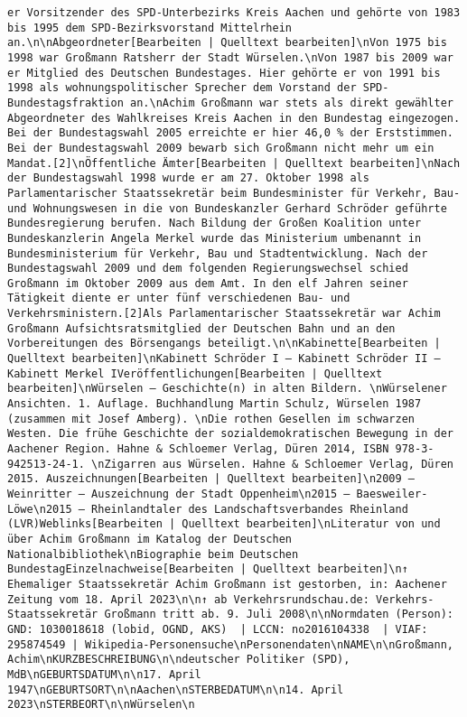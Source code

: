 \documentclass[
]{article}
\begin{document}
\begin{verbatim}
er Vorsitzender des SPD-Unterbezirks Kreis Aachen und gehörte von 1983 bis 1995 dem SPD-Bezirksvorstand Mittelrhein an.\n\nAbgeordneter[Bearbeiten | Quelltext bearbeiten]\nVon 1975 bis 1998 war Großmann Ratsherr der Stadt Würselen.\nVon 1987 bis 2009 war er Mitglied des Deutschen Bundestages. Hier gehörte er von 1991 bis 1998 als wohnungspolitischer Sprecher dem Vorstand der SPD-Bundestagsfraktion an.\nAchim Großmann war stets als direkt gewählter Abgeordneter des Wahlkreises Kreis Aachen in den Bundestag eingezogen. Bei der Bundestagswahl 2005 erreichte er hier 46,0 % der Erststimmen. Bei der Bundestagswahl 2009 bewarb sich Großmann nicht mehr um ein Mandat.[2]\nÖffentliche Ämter[Bearbeiten | Quelltext bearbeiten]\nNach der Bundestagswahl 1998 wurde er am 27. Oktober 1998 als Parlamentarischer Staatssekretär beim Bundesminister für Verkehr, Bau- und Wohnungswesen in die von Bundeskanzler Gerhard Schröder geführte Bundesregierung berufen. Nach Bildung der Großen Koalition unter Bundeskanzlerin Angela Merkel wurde das Ministerium umbenannt in Bundesministerium für Verkehr, Bau und Stadtentwicklung. Nach der Bundestagswahl 2009 und dem folgenden Regierungswechsel schied Großmann im Oktober 2009 aus dem Amt. In den elf Jahren seiner Tätigkeit diente er unter fünf verschiedenen Bau- und Verkehrsministern.[2]Als Parlamentarischer Staatssekretär war Achim Großmann Aufsichtsratsmitglied der Deutschen Bahn und an den Vorbereitungen des Börsengangs beteiligt.\n\nKabinette[Bearbeiten | Quelltext bearbeiten]\nKabinett Schröder I – Kabinett Schröder II – Kabinett Merkel IVeröffentlichungen[Bearbeiten | Quelltext bearbeiten]\nWürselen – Geschichte(n) in alten Bildern. \nWürselener Ansichten. 1. Auflage. Buchhandlung Martin Schulz, Würselen 1987 (zusammen mit Josef Amberg). \nDie rothen Gesellen im schwarzen Westen. Die frühe Geschichte der sozialdemokratischen Bewegung in der Aachener Region. Hahne & Schloemer Verlag, Düren 2014, ISBN 978-3-942513-24-1. \nZigarren aus Würselen. Hahne & Schloemer Verlag, Düren 2015. Auszeichnungen[Bearbeiten | Quelltext bearbeiten]\n2009 – Weinritter – Auszeichnung der Stadt Oppenheim\n2015 – Baesweiler-Löwe\n2015 – Rheinlandtaler des Landschaftsverbandes Rheinland (LVR)Weblinks[Bearbeiten | Quelltext bearbeiten]\nLiteratur von und über Achim Großmann im Katalog der Deutschen Nationalbibliothek\nBiographie beim Deutschen BundestagEinzelnachweise[Bearbeiten | Quelltext bearbeiten]\n↑ Ehemaliger Staatssekretär Achim Großmann ist gestorben, in: Aachener Zeitung vom 18. April 2023\n\n↑ ab Verkehrsrundschau.de: Verkehrs-Staatssekretär Großmann tritt ab. 9. Juli 2008\n\nNormdaten (Person): GND: 1030018618 (lobid, OGND, AKS)  | LCCN: no2016104338  | VIAF: 295874549 | Wikipedia-Personensuche\nPersonendaten\nNAME\n\nGroßmann, Achim\nKURZBESCHREIBUNG\n\ndeutscher Politiker (SPD), MdB\nGEBURTSDATUM\n\n17. April 1947\nGEBURTSORT\n\nAachen\nSTERBEDATUM\n\n14. April 2023\nSTERBEORT\n\nWürselen\n

\end{verbatim}
\end{document}
